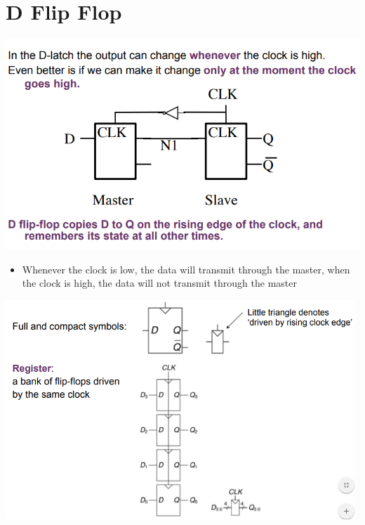 \documentclass{article}[18pt]
\begin{document}
\section{D Flip Flop}
\begin{center}
	\includegraphics[scale=0.7]{figure6}
\end{center}
\begin{itemize}
	\item Whenever the clock is low, the data will transmit through the master, when the clock is high, the data will not transmit through the master
\end{itemize}
\begin{center}
	\includegraphics[scale=0.7]{figure7}
\end{center}
\end{document}
